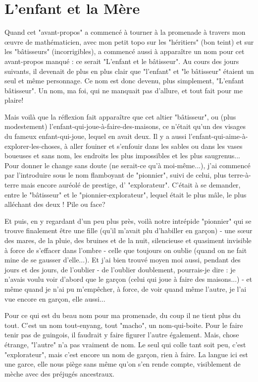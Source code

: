 \section{L'enfant et la Mère}

Quand cet "avant-propos" a commencé à tourner à la promenade à travers mon œuvre de mathématicien, avec mon petit topo sur les "héritiers" (bon teint) et sur les "bâtisseurs" (incorrigibles), a commencé aussi à apparaître un nom pour cet avant-propos manqué : ce serait "L'enfant et le bâtisseur". Au cours des jours suivants, il devenait de plus en plus clair que "l'enfant" et "le bâtisseur" étaient un seul et même personnage. Ce nom est donc devenu, plus simplement, "L'enfant bâtisseur". Un nom, ma foi, qui ne manquait pas d'allure, et tout fait pour me plaire!

Mais voilà que la réflexion fait apparaître que cet altier "bâtisseur", ou (plus modestement) l'enfant-qui-joue-à-faire-des-maisons, ce n'était qu'un des visages du fameux enfant-qui-joue, lequel en avait deux. Il y a aussi l'enfant-qui-aime-à-explorer-les-choses, à aller fouiner et s'enfouir dans les sables ou dans les vases boueuses et sans nom, les endroits les plus impossibles et les plus saugrenus... Pour donner le change sans doute (ne serait-ce qu'à moi-même...), j'ai commencé par l'introduire sous le nom flamboyant de "pionnier", suivi de celui, plus terre-à-terre mais encore auréolé de prestige, d' "explorateur". C'était à se demander, entre le "bâtisseur" et le "pionnier-explorateur", lequel était le plus mâle, le plus alléchant des deux ! Pile ou face?

Et puis, en y regardant d'un peu plus près, voilà notre intrépide "pionnier" qui se trouve finalement être une fille (qu'il m'avait plu d'habiller en garçon) - une sœur des mares, de la pluie, des bruines et de la nuit, silencieuse et quasiment invisible à force de s'effacer dans l'ombre - celle que toujours on oublie (quand on ne fait mine de se gausser d'elle...). Et j'ai bien trouvé moyen moi aussi, pendant des jours et des jours, de l'oublier - de l'oublier doublement, pourrais-je dire : je n'avais voulu voir d'abord que le garçon (celui qui joue à faire des maisons...) - et même quand je n'ai pu m'empêcher, à force, de voir quand même l'autre, je l'ai vue encore en garçon, elle aussi...

Pour ce qui est du beau nom pour ma promenade, du coup il ne tient plus du tout. C'est un nom tout-enyang, tout "macho", un nom-qui-boite. Pour le faire tenir pas de guingois, il faudrait y faire figurer l'autre également. Mais, chose étrange, "l'autre" n'a pas vraiment de nom. Le seul qui colle tant soit peu, c'est "explorateur", mais c'est encore un nom de garçon, rien à faire. La langue ici est une garce, elle nous piège sans même qu'on s'en rende compte, visiblement de mèche avec des préjugés ancestraux.

